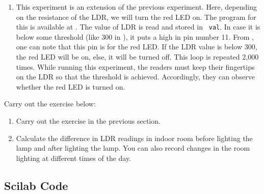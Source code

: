 \begin{enumerate}
  \item This experiment is an extension of the previous
        experiment. Here, depending on the resistance of the LDR, we will
        turn the red LED on.  The program for this is available at
        .  The value of LDR is read and stored in {\tt
            val}.  In case it is below some threshold (like 300 in ), 
        it puts a high in pin number 11.  From , 
        one can note that this pin is for the red LED.  If the LDR value is below 300, 
        the red LED will be on, else, it will be turned off.  
        This loop is repeated 2,000 times. While running this experiment, the readers 
        must keep their fingertips on the LDR so that the threshold is achieved. Accordingly, 
        they can observe whether the red LED is turned on. 
\end{enumerate}

\begin{exercise}
  Carry out the exercise below:
  \begin{enumerate}
    \item Carry out the exercise in the previous section.
    \item Calculate the difference in LDR readings in indoor room
          before lighting the lamp and after lighting the lamp. You can also
          record changes in the room lighting at different times of the day.
  \end{enumerate}
\end{exercise}

\subsection{Scilab Code}
\label{sec:ldr-scilab-code}


